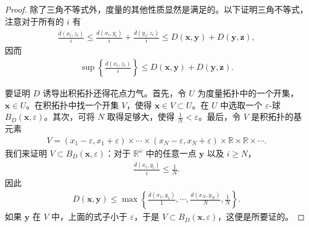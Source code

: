 \documentclass[../../main.tex]{subfiles}
\begin{document}
\begin{proof}
除了三角不等式外，度量的其他性质显然是满足的。以下证明三角不等式，注意对于所有的 $i$ 有
\begin{align*}
\frac{\bar{d}(x_{i}, z_{i})}{i} \leqslant \frac{\bar{d}(x_{i}, y_{i})}{i} + \frac{\bar{d}(y_{i}, z_{i})}{i} \leqslant D(\boldsymbol{x}, \boldsymbol{y}) + D(\boldsymbol{y}, \boldsymbol{z}),
\end{align*}
因而
\begin{align*}
\sup \left\{\frac{\bar{d}(x_{i}, z_{i})}{i}\right\} \leqslant D(\boldsymbol{x}, \boldsymbol{y}) + D(\boldsymbol{y}, \boldsymbol{z}).
\end{align*}

要证明 $D$ 诱导出积拓扑还得花点力气。首先，令 $U$ 为度量拓扑中的一个开集，$\boldsymbol{x} \in U$。在积拓扑中找一个开集 $V$，使得 $\boldsymbol{x} \in V \subset U$。在 $U$ 中选取一个 $\varepsilon$-球 $B_{D}(\boldsymbol{x}, \varepsilon)$。其次，可将 $N$ 取得足够大，使得 $\frac{1}{N} < \varepsilon$。最后，令 $V$ 是积拓扑的基元素
\begin{align*}
V = (x_{1} - \varepsilon, x_{1} + \varepsilon) \times \cdots \times (x_{N} - \varepsilon, x_{N} + \varepsilon) \times \mathbb{R} \times \mathbb{R} \times \cdots.
\end{align*}
我们来证明 $V \subset B_{D}(\boldsymbol{x}, \varepsilon)$：对于 $\mathbb{R}^{\omega}$ 中的任意一点 $\boldsymbol{y}$ 以及 $i \geqslant N$，
\begin{align*}
\frac{\bar{d}(x_{i}, y_{i})}{i} \leqslant \frac{1}{N}.
\end{align*}
因此
\begin{align*}
D(\boldsymbol{x}, \boldsymbol{y}) \leqslant \max \left\{\frac{\bar{d}(x_{1}, y_{1})}{1}, \cdots, \frac{\bar{d}(x_{N}, y_{N})}{N}, \frac{1}{N}\right\}.
\end{align*}
如果 $\boldsymbol{y}$ 在 $V$ 中，上面的式子小于 $\varepsilon$，于是 $V \subset B_{D}(\boldsymbol{x}, \varepsilon)$，这便是所要证的。


\end{proof}
\end{document}
